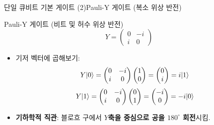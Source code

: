 \documentclass[aspectratio=169, 10pt]{beamer}
\begin{document}
\begin{frame}{단일 큐비트 기본 게이트 (2)}{Pauli-Y 게이트 (복소 위상 반전)}
    \begin{block}{Pauli-Y 게이트 (비트 및 허수 위상 반전)}
        $$Y = \begin{pmatrix} 0 & -i \\ i & 0 \end{pmatrix}$$ \pause
        \begin{itemize}
            \item 기저 벡터에 곱해보기:
            $$Y|0\rangle = \begin{pmatrix} 0 & -i \\ i & 0 \end{pmatrix}\begin{pmatrix} 1 \\ 0 \end{pmatrix} = \begin{pmatrix} 0 \\ i \end{pmatrix} = i|1\rangle$$
            $$Y|1\rangle = \begin{pmatrix} 0 & -i \\ i & 0 \end{pmatrix}\begin{pmatrix} 0 \\ 1 \end{pmatrix} = \begin{pmatrix} -i \\ 0 \end{pmatrix} = -i|0\rangle$$
            \item \textbf{기하학적 직관}: 블로흐 구에서 \textbf{$Y$축을 중심으로 공을 $180^\circ$ 회전}시킴.
        \end{itemize}
    \end{block}
\end{frame}
\end{document}
